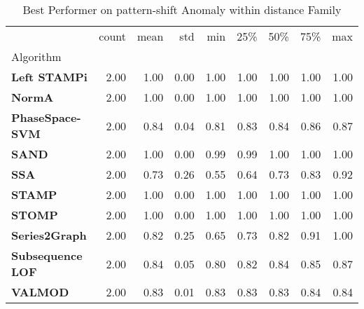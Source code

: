 \begin{table}
\caption{Best Performer on pattern-shift Anomaly within distance Family}
\label{tab:bp-pattern-shift_distance}
\begin{tabular}{lrrrrrrrr}
\toprule
 & count & mean & std & min & 25\% & 50\% & 75\% & max \\
Algorithm &  &  &  &  &  &  &  &  \\
\midrule
\textbf{Left STAMPi} & 2.00 & 1.00 & 0.00 & 1.00 & 1.00 & 1.00 & 1.00 & 1.00 \\
\textbf{NormA} & 2.00 & 1.00 & 0.00 & 1.00 & 1.00 & 1.00 & 1.00 & 1.00 \\
\textbf{PhaseSpace-SVM} & 2.00 & 0.84 & 0.04 & 0.81 & 0.83 & 0.84 & 0.86 & 0.87 \\
\textbf{SAND} & 2.00 & 1.00 & 0.00 & 0.99 & 0.99 & 1.00 & 1.00 & 1.00 \\
\textbf{SSA} & 2.00 & 0.73 & 0.26 & 0.55 & 0.64 & 0.73 & 0.83 & 0.92 \\
\textbf{STAMP} & 2.00 & 1.00 & 0.00 & 1.00 & 1.00 & 1.00 & 1.00 & 1.00 \\
\textbf{STOMP} & 2.00 & 1.00 & 0.00 & 1.00 & 1.00 & 1.00 & 1.00 & 1.00 \\
\textbf{Series2Graph} & 2.00 & 0.82 & 0.25 & 0.65 & 0.73 & 0.82 & 0.91 & 1.00 \\
\textbf{Subsequence LOF} & 2.00 & 0.84 & 0.05 & 0.80 & 0.82 & 0.84 & 0.85 & 0.87 \\
\textbf{VALMOD} & 2.00 & 0.83 & 0.01 & 0.83 & 0.83 & 0.83 & 0.84 & 0.84 \\
\bottomrule
\end{tabular}
\end{table}

